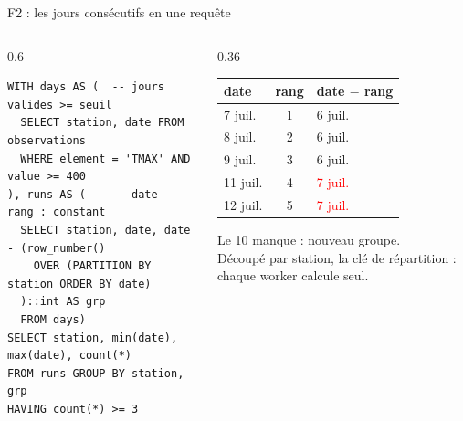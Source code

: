 \documentclass[aspectratio=169]{pres}
\begin{document}
\begin{frame}[fragile]{F2 : les jours consécutifs en une requête}
  \begin{columns}[T]
    \begin{column}{0.6\textwidth}
\begin{lstlisting}[style=sql]
WITH days AS (  -- jours valides >= seuil
  SELECT station, date FROM observations
  WHERE element = 'TMAX' AND value >= 400
), runs AS (    -- date - rang : constant
  SELECT station, date, date - (row_number()
    OVER (PARTITION BY station ORDER BY date)
  )::int AS grp
  FROM days)
SELECT station, min(date), max(date), count(*)
FROM runs GROUP BY station, grp
HAVING count(*) >= 3
\end{lstlisting}
    \end{column}
    \begin{column}{0.36\textwidth}
      \small
      \begin{tabular}{|l|c|l|}
        \hline
        \textbf{date} & \textbf{rang} & \textbf{date $-$ rang} \\ \hline
        7 juil. & 1 & 6 juil. \\
        8 juil. & 2 & 6 juil. \\
        9 juil. & 3 & 6 juil. \\ \hline
        11 juil. & 4 & \textcolor{red}{7 juil.} \\
        12 juil. & 5 & \textcolor{red}{7 juil.} \\ \hline
      \end{tabular}
      \vspace{0.5em}

      Le 10 manque : nouveau groupe.\\[0.4em]
      Découpé par station, la clé de répartition : chaque worker calcule seul.
    \end{column}
  \end{columns}
\end{frame}
\end{document}
